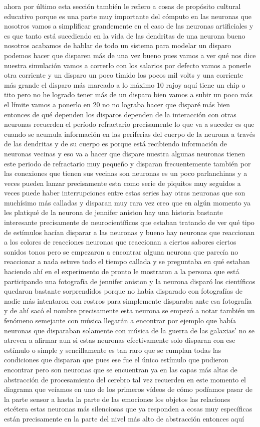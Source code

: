 ahora por último esta sección también le refiero a cosas de propósito cultural educativo porque es una parte muy importante del cómputo en las neuronas que nosotros vamos a simplificar grandemente en el caso de las neuronas artificiales y es que tanto está sucediendo en la vida de las dendritas de una neurona bueno nosotros acabamos de hablar de todo un sistema para modelar un disparo podemos hacer que disparen más de una vez bueno pues vamos a ver qué nos dice nuestra simulación vamos a correrlo con los salarios por defecto vamos a ponerle otra corriente y un disparo un poco tímido los pocos mil volts y una corriente más grande el disparo más marcado a lo máximo 10 rajoy aquí tiene un chip o tito pero no he logrado tener más de un disparo bien vamos a subir un poco más el límite vamos a ponerlo en 20 no no lograba hacer que disparé más bien entonces de qué dependen los disparos dependen de la interacción con otras neuronas recuerden el período refractario precisamente lo que va a suceder es que cuando se acumula información en las periferias del cuerpo de la neurona a través de las dendritas y de su cuerpo es porque está recibiendo información de neuronas vecinas y eso va a hacer que dispare nuestra algunas neuronas tienen este periodo de refractario muy pequeño y disparan frecuentemente también por las conexiones que tienen sus vecinas son neuronas es un poco parlanchinas y a veces pueden lanzar precisamente esta como serie de piquitos muy seguidos a veces puede haber interrupciones entre estas series hay otras neuronas que son muchísimo más calladas y disparan muy rara vez creo que en algún momento ya les platiqué de la neurona de jennifer aniston hay una historia bastante interesante precisamente de neurocientíficos que estaban tratando de ver qué tipo de estímulos hacían disparar a las neuronas y bueno hay neuronas que reaccionan a los colores de reacciones neuronas que reaccionan a ciertos sabores ciertos sonidos tonos pero se empezaron a encontrar alguna neurona que parecía no reaccionar a nada estuve todo el tiempo callada y se preguntaba en qué estaban haciendo ahí en el experimento de pronto le mostraron a la persona que está participando una fotografía de jennifer aniston y la neurona disparó los científicos quedaron bastante sorprendidos porque no había disparado con fotografías de nadie más intentaron con rostros para simplemente disparaba ante esa fotografía y de ahí sacó el nombre precisamente esta neurona se empezó a notar también un fenómeno semejante con música llegarán a encontrar por ejemplo que había neuronas que disparaban solamente con música de la guerra de las galaxias' no se atreven a afirmar aun si estas neuronas efectivamente solo disparan con ese estímulo o simple y sencillamente es tan raro que se cumplan todas las condiciones que disparan que pues ese fue el único estímulo que pudieron encontrar pero son neuronas que se encuentran ya en las capas más altas de abstracción de procesamiento del cerebro tal vez recuerden en este momento el diagrama que veíamos en uno de los primeros vídeos de cómo podíamos pasar de la parte sensor a hasta la parte de las emociones los objetos las relaciones etcétera estas neuronas más silenciosas que ya responden a cosas muy específicas están precisamente en la parte del nivel más alto de abstracción entonces aquí 